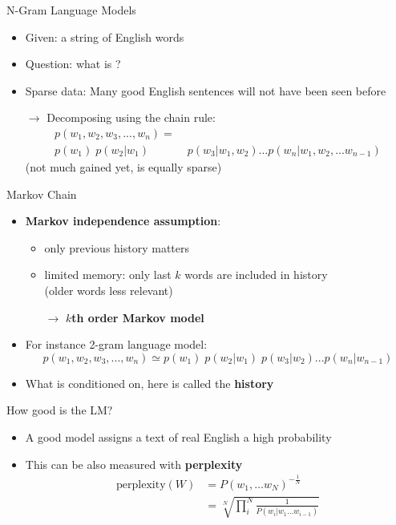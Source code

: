 \documentclass[compress]{beamer}
\begin{document}
\begin{frame}{N-Gram Language Models}
\begin{itemize}
\item Given: a string of English words 
\item Question: what is ?
\item Sparse data: Many good English sentences will not have been seen before
\item[$\rightarrow$] Decomposing  using the chain rule:
\begin{align*}
p(w_1,w_2,w_3,...,w_n) = & \\ p(w_1)\;p(w_2|w_1)&\;p(w_3|w_1,w_2) \dots p(w_n|w_1,w_2,...w_{n-1})
\end{align*}
(not much gained yet,  is equally sparse)
\end{itemize}

\end{frame}

\begin{frame}{Markov Chain}
\begin{itemize}
\item {\bf Markov independence assumption}:
\begin{itemize}
\item only previous history matters
\item limited memory: only last $k$ words are included in history \\(older words less relevant)
\item[$\rightarrow$] {\bf $k$th order Markov model}
\end{itemize}
\item For instance 2-gram language model:
\begin{equation*}
p(w_1,w_2,w_3,...,w_n) \simeq p(w_1)\;p(w_2|w_1)\;p(w_3|w_2) ... p(w_n|w_{n-1})
\end{equation*}
\item What is conditioned on, here  is called the {\bf history}
\end{itemize}

\end{frame}


\begin{frame}{How good is the LM?}
\begin{itemize}
\item A good model assigns a text of real English  a high probability
\item This can be also measured with {\bf perplexity}
\begin{align*}
\text{perplexity}(W) & = P(w_1, \dots w_N)^{-\frac{1}{N}} \\
	& = \sqrt[N]{\prod_i^N \frac{1}{P(w_i | w_1 \dots w_{i-1})}}
\end{align*}
\end{itemize}

\end{frame}
\end{document}
